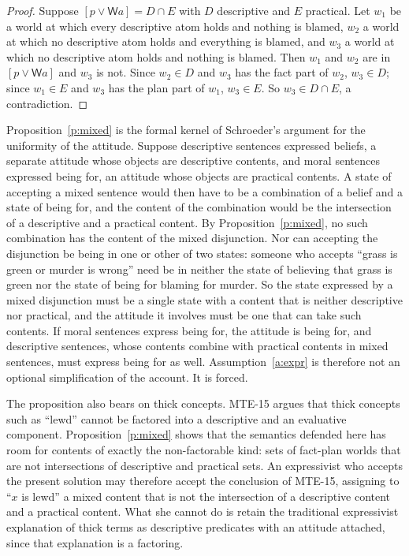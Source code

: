 \documentclass{situationist-preprint}
\begin{document}
\begin{proof}
Suppose $[p\vee\mathsf{W}a]=D\cap E$ with $D$ descriptive and $E$ practical. Let $w_1$ be a world at which every descriptive atom holds and nothing is blamed, $w_2$ a world at which no descriptive atom holds and everything is blamed, and $w_3$ a world at which no descriptive atom holds and nothing is blamed. Then $w_1$ and $w_2$ are in $[p\vee\mathsf{W}a]$ and $w_3$ is not. Since $w_2\in D$ and $w_3$ has the fact part of $w_2$, $w_3\in D$; since $w_1\in E$ and $w_3$ has the plan part of $w_1$, $w_3\in E$. So $w_3\in D\cap E$, a contradiction.
\end{proof}

Proposition~\ref{p:mixed} is the formal kernel of Schroeder's argument for the uniformity of the attitude. Suppose descriptive sentences expressed beliefs, a separate attitude whose objects are descriptive contents, and moral sentences expressed being for, an attitude whose objects are practical contents. A state of accepting a mixed sentence would then have to be a combination of a belief and a state of being for, and the content of the combination would be the intersection of a descriptive and a practical content. By Proposition~\ref{p:mixed}, no such combination has the content of the mixed disjunction. Nor can accepting the disjunction be being in one or other of two states: someone who accepts \enquote{grass is green or murder is wrong} need be in neither the state of believing that grass is green nor the state of being for blaming for murder. So the state expressed by a mixed disjunction must be a single state with a content that is neither descriptive nor practical, and the attitude it involves must be one that can take such contents. If moral sentences express being for, the attitude is being for, and descriptive sentences, whose contents combine with practical contents in mixed sentences, must express being for as well. Assumption~\ref{a:expr} is therefore not an optional simplification of the account. It is forced.

The proposition also bears on thick concepts. MTE-15 argues that thick concepts such as \enquote{lewd} cannot be factored into a descriptive and an evaluative component. Proposition~\ref{p:mixed} shows that the semantics defended here has room for contents of exactly the non-factorable kind: sets of fact-plan worlds that are not intersections of descriptive and practical sets. An expressivist who accepts the present solution may therefore accept the conclusion of MTE-15, assigning to \enquote{$x$ is lewd} a mixed content that is not the intersection of a descriptive content and a practical content. What she cannot do is retain the traditional expressivist explanation of thick terms as descriptive predicates with an attitude attached, since that explanation is a factoring.
\end{document}
